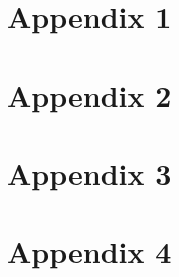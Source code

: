 \documentclass{article}
\begin{document}
\section{Appendix 1}

\section{Appendix 2}

\section{Appendix 3}

\section{Appendix 4}

\end{document}
